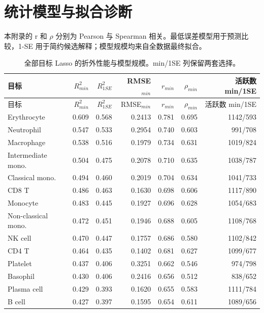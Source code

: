 \clearpage\section{统计模型与拟合诊断}\label{app:B}\setcounter{figure}{0}\setcounter{table}{0}
本附录的 r 和 $\rho$ 分别为 Pearson 与 Spearman 相关。最低误差模型用于预测比较，1-SE 用于简约候选解释；模型规模均来自全数据最终拟合。
{\small\linespread{1}\selectfont\setlength{\tabcolsep}{4pt}\renewcommand{\arraystretch}{1.08}\begin{longtable}{lrrrrrr}\caption{全部目标 Lasso 的折外性能与模型规模。min/1SE 列保留两套选择。}\\\toprule 目标 & $R^2_{min}$ & $R^2_{1SE}$ & RMSE$_{min}$ & $r_{min}$ & $\rho_{min}$ & 活跃数 min/1SE\\\midrule\endfirsthead\toprule 目标 & $R^2_{min}$ & $R^2_{1SE}$ & RMSE$_{min}$ & $r_{min}$ & $\rho_{min}$ & 活跃数 min/1SE\\\midrule\endhead
Erythrocyte & 0.609 & 0.568 & 0.2413 & 0.781 & 0.695 & 1142/593\\
Neutrophil & 0.547 & 0.533 & 0.2954 & 0.740 & 0.603 & 991/708\\
Macrophage & 0.538 & 0.516 & 0.1979 & 0.734 & 0.631 & 1019/824\\
Intermediate mono. & 0.504 & 0.475 & 0.2078 & 0.710 & 0.635 & 1038/787\\
Classical mono. & 0.494 & 0.460 & 0.2019 & 0.704 & 0.634 & 1041/733\\
CD8 T & 0.486 & 0.463 & 0.1630 & 0.698 & 0.606 & 1117/890\\
Monocyte & 0.483 & 0.445 & 0.1927 & 0.696 & 0.628 & 1054/683\\
Non-classical mono. & 0.472 & 0.451 & 0.1946 & 0.688 & 0.605 & 1108/768\\
NK cell & 0.470 & 0.447 & 0.1757 & 0.686 & 0.580 & 1102/842\\
CD4 T & 0.464 & 0.435 & 0.1402 & 0.681 & 0.627 & 1099/677\\
Platelet & 0.437 & 0.406 & 0.3251 & 0.662 & 0.546 & 974/798\\
Basophil & 0.430 & 0.406 & 0.2416 & 0.656 & 0.512 & 838/652\\
Plasma cell & 0.429 & 0.393 & 0.1620 & 0.655 & 0.583 & 1111/784\\
B cell & 0.427 & 0.397 & 0.1595 & 0.654 & 0.611 & 1089/656\\

\end{longtable}}
